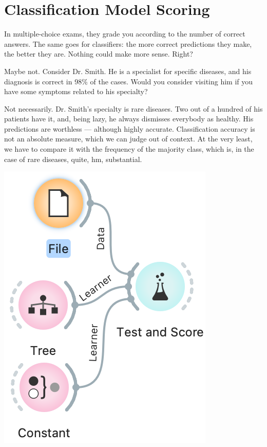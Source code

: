 \chapter{Classification Model Scoring}
\label{ch:model-scoring}

In multiple-choice exams, they grade you according to the number of correct answers. The same goes for classifiers: the more correct predictions they make, the better they are. Nothing could make more sense. Right?

Maybe not. Consider Dr. Smith. He is a specialist for specific diseases, and his diagnosis is correct in 98\% of the cases. Would you consider visiting him if you have some symptoms related to his specialty?

Not necessarily. Dr. Smith's specialty is rare diseases. Two out of a hundred of his patients have it, and, being lazy, he always dismisses everybody as healthy. His predictions are worthless — although highly accurate. Classification accuracy is not an absolute measure, which we can judge out of context. At the very least, we have to compare it with the frequency of the majority class, which is, in the case of rare diseases, quite, hm, substantial.

\begin{marginfigure}
    \includegraphics[scale=0.5]{tree-vs-constant.png}%
    \caption{$\;$}
\end{marginfigure}

